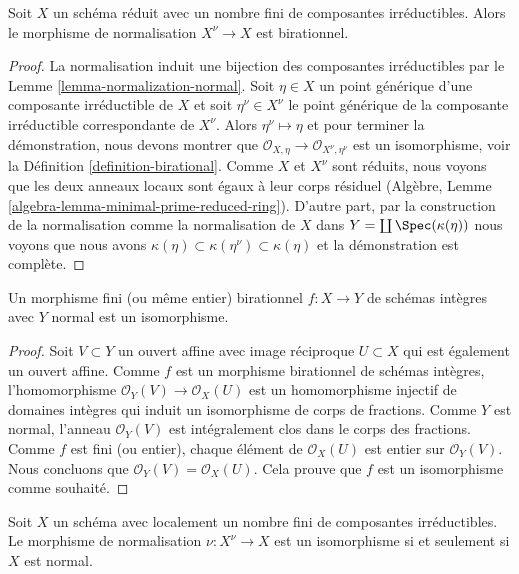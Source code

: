 \begin{lemma}
\label{lemma-normalization-birational}
Soit $X$ un schéma réduit avec un nombre fini de composantes irréductibles.
Alors le morphisme de normalisation $X^\nu \to X$ est birationnel.
\end{lemma}

\begin{proof}
La normalisation induit une bijection des composantes irréductibles
par le Lemme \ref{lemma-normalization-normal}. Soit $\eta \in X$ un point générique
d'une composante irréductible de $X$ et soit
$\eta^\nu \in X^\nu$ le point générique de la composante irréductible correspondante
de $X^\nu$. Alors $\eta^\nu \mapsto \eta$ et pour terminer la démonstration,
nous devons montrer que $\mathcal{O}_{X, \eta} \to \mathcal{O}_{X^\nu, \eta^\nu}$ est
un isomorphisme, voir la Définition \ref{definition-birational}. Comme
$X$ et $X^\nu$ sont réduits, nous voyons que les
deux anneaux locaux sont égaux
à leur corps résiduel (Algèbre, Lemme \ref{algebra-lemma-minimal-prime-reduced-ring}).
D'autre part, par la construction de la normalisation
comme la normalisation de $X$ dans $Y = \coprod \Spec(\kappa(\eta))$
nous voyons que
nous avons $\kappa(\eta) \subset \kappa(\eta^\nu) \subset \kappa(\eta)$ et la démonstration
est complète.
\end{proof}

\begin{lemma}
\label{lemma-finite-birational-over-normal}
Un morphisme fini (ou même entier) birationnel $f : X \to Y$ de schémas
intègres avec $Y$ normal est un isomorphisme.
\end{lemma}

\begin{proof}
Soit $V \subset Y$ un ouvert affine avec
image réciproque $U \subset X$ qui est également un ouvert affine.
Comme $f$ est un morphisme birationnel de schémas intègres, l'homomorphisme
$\mathcal{O}_Y(V) \to \mathcal{O}_X(U)$ est un homomorphisme injectif de domaines intègres qui
induit un isomorphisme de corps de fractions. Comme $Y$
est normal, l'anneau $\mathcal{O}_Y(V)$ est intégralement clos dans le corps des
fractions. Comme $f$ est fini (ou entier), chaque élément
de $\mathcal{O}_X(U)$ est entier sur $\mathcal{O}_Y(V)$. Nous concluons
que $\mathcal{O}_Y(V) = \mathcal{O}_X(U)$. Cela prouve que $f$ est un isomorphisme
comme souhaité.
\end{proof}

\begin{lemma}
\label{lemma-normalization-trivial}
Soit $X$ un schéma avec localement un nombre fini de composantes irréductibles.
Le morphisme de normalisation $\nu : X^\nu \to X$ est un isomorphisme si et seulement
si $X$ est normal.
\end{lemma}

